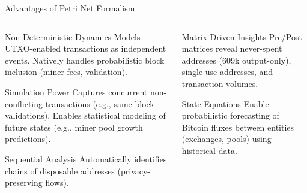 \documentclass{beamer}
\begin{document}
\begin{frame}{Advantages of Petri Net Formalism}
    \footnotesize
    \begin{columns}[T]
        \begin{column}{0.45\textwidth}
            \vspace{-0.1cm}

            \begin{block}{Non-Deterministic Dynamics}
                Models UTXO-enabled transactions as independent events. Natively handles probabilistic block inclusion (miner fees, validation).
            \end{block}
            \vspace{-0.1cm}

            \begin{block}{Simulation Power}
                Captures concurrent non-conflicting transactions (e.g., same-block validations). Enables statistical modeling of future states (e.g., miner pool growth predictions).
            \end{block}
            \vspace{-0.1cm}

            \begin{block}{Sequential Analysis}
                Automatically identifies chains of disposable addresses (privacy-preserving flows).
            \end{block}
        \end{column}
        \begin{column}{0.45\textwidth}
            \vspace{-0.1cm}

            \begin{block}{Matrix-Driven Insights}
                Pre/Post matrices reveal never-spent addresses (609k output-only), single-use addresses, and transaction volumes.
            \end{block}
            \vspace{-0.1cm}

            \begin{block}{State Equations}
                Enable probabilistic forecasting of Bitcoin fluxes between entities (exchanges, pools) using historical data.
            \end{block}
        \end{column}
    \end{columns}
\end{frame}
\end{document}
